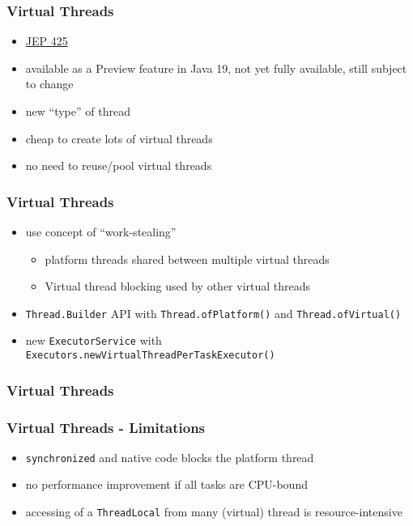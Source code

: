 \documentclass{beamer}
\begin{document}
\begin{frame}
\frametitle{Virtual Threads}
\begin{itemize}
  \item \href{https://openjdk.org/jeps/425}{JEP 425}
  \item available as a Preview feature in Java 19, not yet fully available, still subject to change
  \pause
  \item new ``type'' of thread
  \item cheap to create lots of virtual threads
  \item no need to reuse/pool virtual threads
\end{itemize}
\end{frame}
\begin{frame}
\frametitle{Virtual Threads}
\begin{itemize}
  \item use concept of ``work-stealing''
  \begin{itemize}
	\item platform threads shared between multiple virtual threads
	\item Virtual thread blocking \textrightarrow{} used by other virtual threads
  \end{itemize}
  \pause
  \item \texttt{Thread.Builder} API with \texttt{Thread.ofPlatform()} and \texttt{Thread.ofVirtual()}
  \item new \texttt{ExecutorService} with \texttt{Executors.newVirtualThreadPerTaskExecutor()}
\end{itemize}
\end{frame}
\begin{frame}
\frametitle{Virtual Threads}

\end{frame}
\begin{frame}
\frametitle{Virtual Threads - Limitations}
\begin{itemize}
  \item \texttt{synchronized} and native code blocks the platform thread
  \item no performance improvement if all tasks are CPU-bound
  \item accessing of a \texttt{ThreadLocal} from many (virtual) thread is resource-intensive
\end{itemize}
\end{frame}
\end{document}
